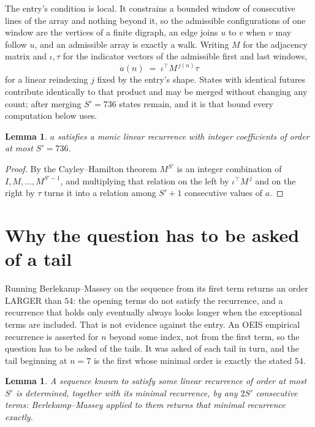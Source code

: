 \documentclass[11pt,a4paper]{article}
\theoremstyle{plain}
\newtheorem{lemma}[theorem]{Lemma}
\theoremstyle{definition}
\begin{document}
The entry's condition is local. It constrains a bounded window of consecutive lines of the
array and nothing beyond it, so the admissible configurations of one window are the vertices of
a finite digraph, an edge joins $u$ to $v$ when $v$ may follow $u$, and an admissible array is
exactly a walk. Writing $M$ for the adjacency matrix and $\iota,\tau$ for the indicator vectors
of the admissible first and last windows,
\[
a(n)\;=\;\iota^{\!\top}M^{\,j(n)}\tau
\]
for a linear reindexing $j$ fixed by the entry's shape. States with identical futures
contribute identically to that product and may be merged without changing any count; after
merging $S'=736$ states remain, and it is that bound every computation below uses.

\begin{lemma}\label{lem:cf}
$a$ satisfies a monic linear recurrence with integer coefficients of order at most $S'=736$.
\end{lemma}

\begin{proof}
By the Cayley--Hamilton theorem $M^{S'}$ is an integer combination of $I,M,\dots,M^{S'-1}$,
and multiplying that relation on the left by $\iota^{\!\top}M^{\,j}$ and on the right by
$\tau$ turns it into a relation among $S'+1$ consecutive values of $a$.
\end{proof}

\section{Why the question has to be asked of a tail}

Running Berlekamp--Massey on the sequence from its first term returns an order LARGER than $54$: the opening terms do not satisfy the recurrence, and a recurrence that holds only eventually always looks longer when the exceptional terms are included. That is not evidence against the entry. An OEIS empirical recurrence is asserted for $n$ beyond some index, not from the first term, so the question has to be asked of the tails. It was asked of each tail in turn, and the tail beginning at $n=7$ is the first whose minimal order is exactly the stated $54$.

\begin{lemma}\label{lem:bm}
A sequence known to satisfy some linear recurrence of order at most $S'$ is determined,
together with its minimal recurrence, by any $2S'$ consecutive terms: Berlekamp--Massey applied
to them returns that minimal recurrence exactly.
\end{lemma}
\end{document}
